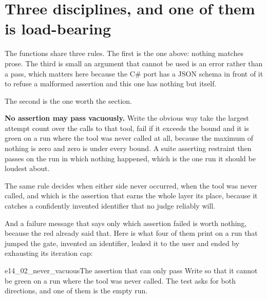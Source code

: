 \section{Three disciplines, and one of them is load-bearing}
\label{sec:ch14-disciplines}

The  functions share three rules. The first is the one
above: nothing matches prose. The third is small \dash{} an argument that
cannot be used is an error rather than a pass, which matters here because
the C\# port has a JSON schema in front of it to refuse a malformed
assertion and this one has nothing but itself.

The second is the one worth the section.

\begin{trapbox}
\textbf{No assertion may pass vacuously.} Write
 the obvious way \dash{} take the largest attempt
count over the calls to that tool, fail if it exceeds the bound \dash{} and
it is green on a run where the tool was never called at all, because the
maximum of nothing is zero and zero is under every bound. A suite asserting
restraint then passes on the run in which nothing happened, which is the
one run it should be loudest about.
\end{trapbox}


\noindent
The same rule decides  when either side never occurred,
 when the tool was never called, and
 \dash{} which is the assertion that earns the
whole layer its place, because it catches a confidently invented identifier
that no judge reliably will.


\noindent
And a failure message that says only which assertion failed is worth
nothing, because the red already said that. Here is what four of them print
on a run that jumped the gate, invented an identifier, leaked it to the
user and ended by exhausting its iteration cap:


\begin{exercise}{e14_02_never_vacuous}{The assertion that can only pass}
Write  so that it cannot be green on a run where the
tool was never called. The test asks for both directions, and one of them
is the empty run.
\end{exercise}

